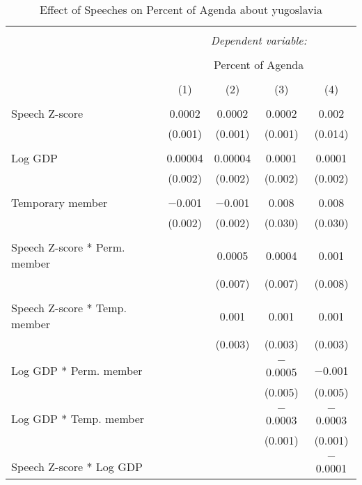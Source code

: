 
\begin{table}[!htbp] \centering 
  \caption{Effect of Speeches on Percent of Agenda about yugoslavia} 
  \label{} 
\begin{tabular}{@{\extracolsep{5pt}}lcccc} 
\\[-1.8ex]\hline 
\hline \\[-1.8ex] 
 & \multicolumn{4}{c}{\textit{Dependent variable:}} \\ 
\cline{2-5} 
\\[-1.8ex] & \multicolumn{4}{c}{Percent of Agenda} \\ 
\\[-1.8ex] & (1) & (2) & (3) & (4)\\ 
\hline \\[-1.8ex] 
 Speech Z-score & 0.0002 & 0.0002 & 0.0002 & 0.002 \\ 
  & (0.001) & (0.001) & (0.001) & (0.014) \\ 
  & & & & \\ 
 Log GDP & 0.00004 & 0.00004 & 0.0001 & 0.0001 \\ 
  & (0.002) & (0.002) & (0.002) & (0.002) \\ 
  & & & & \\ 
 Temporary member & $-$0.001 & $-$0.001 & 0.008 & 0.008 \\ 
  & (0.002) & (0.002) & (0.030) & (0.030) \\ 
  & & & & \\ 
 Speech Z-score * Perm. member &  & 0.0005 & 0.0004 & 0.001 \\ 
  &  & (0.007) & (0.007) & (0.008) \\ 
  & & & & \\ 
 Speech Z-score * Temp. member &  & 0.001 & 0.001 & 0.001 \\ 
  &  & (0.003) & (0.003) & (0.003) \\ 
  & & & & \\ 
 Log GDP * Perm. member &  &  & $-$0.0005 & $-$0.001 \\ 
  &  &  & (0.005) & (0.005) \\ 
  & & & & \\ 
 Log GDP * Temp. member &  &  & $-$0.0003 & $-$0.0003 \\ 
  &  &  & (0.001) & (0.001) \\ 
  & & & & \\ 
 Speech Z-score * Log GDP &  &  &  & $-$0.0001 \\ 

\end{tabular}
\end{table}
